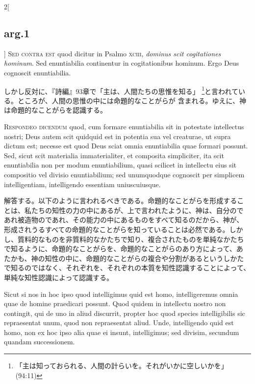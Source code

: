 \documentclass[paper=a4paper,fontsize=10pt,jafontsize=9pt,titlepage]{jlreq}
\begin{document}
\begin{paracol}{2}[\subsection{arg.1}]
{\scshape Sed contra est} quod dicitur in Psalmo {\scshape xciii},
{\itshape dominus scit cogitationes hominum}. Sed enuntiabilia
continentur in cogitationibus hominum. Ergo Deus cognoscit
enuntiabilia.

\switchcolumn

しかし反対に、『詩編』93章で「主は、人間たちの思惟を知る」
\footnote{「主は知っておられる、人間の計らいを。それがいかに空しいかを」
(94:11)}と言われている。ところが、人間の思惟の中には命題的なことがらが
含まれる。ゆえに、神は命題的なことがらを認識する。


{\scshape Respondeo dicendum} quod, cum formare enuntiabilia sit in
potestate intellectus nostri; Deus autem scit quidquid est in potentia
sua vel creaturae, ut supra dictum est; necesse est quod Deus sciat
omnia enuntiabilia quae formari possunt. Sed, sicut scit materialia
immaterialiter, et composita simpliciter, ita scit enuntiabilia non
per modum enuntiabilium, quasi scilicet in intellectu eius sit
compositio vel divisio enuntiabilium; sed unumquodque cognoscit per
simplicem intelligentiam, intelligendo essentiam uniuscuiusque.

\switchcolumn

解答する。以下のように言われるべきである。命題的なことがらを形成するこ
とは、私たちの知性の力の中にあるが、上で言われたように、神は、自分ので
あれ被造物のであれ、その能力の中にあるものをすべて知るのだから、神が、
形成されうるすべての命題的なことがらを知っていることは必然である。しか
し、質料的なものを非質料的なかたちで知り、複合されたものを単純なかたち
で知るように、命題的なことがらを、命題的なことがらのあり方によって、あ
たかも、神の知性の中に、命題的なことがらの複合や分割があるというしかた
で知るのではなく、それぞれを、それぞれの本質を知性認識することによって、
単純な知性認識によって認識する。

\switchcolumn*

Sicut si nos in hoc ipso quod intelligimus quid est homo,
intelligeremus omnia quae de homine praedicari possunt. Quod quidem in
intellectu nostro non contingit, qui de uno in aliud discurrit,
propter hoc quod species intelligibilis sic repraesentat unum, quod
non repraesentat aliud. Unde, intelligendo quid est homo, non ex hoc
ipso alia quae ei insunt, intelligimus; sed divisim, secundum quandam
successionem.


\end{paracol}
\end{document}
